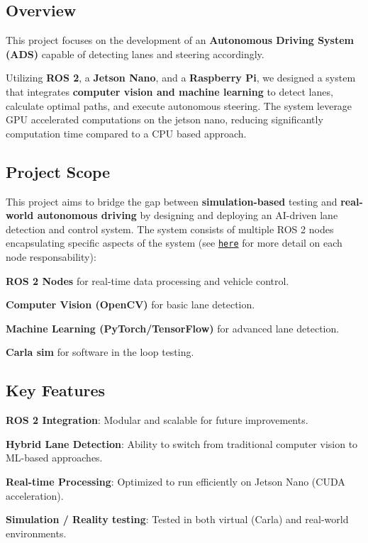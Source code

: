 \subsection*{Overview}

This project focuses on the development of an {\bfseries Autonomous Driving System (A\+DS)} capable of detecting lanes and steering accordingly.

Utilizing {\bfseries R\+OS 2}, a {\bfseries Jetson Nano}, and a {\bfseries Raspberry Pi}, we designed a system that integrates {\bfseries computer vision and machine learning} to detect lanes, calculate optimal paths, and execute autonomous steering. The system leverage G\+PU accelerated computations on the jetson nano, reducing significantly computation time compared to a C\+PU based approach.

\subsection*{Project Scope}

This project aims to bridge the gap between {\bfseries simulation-\/based} testing and {\bfseries real-\/world autonomous driving} by designing and deploying an A\+I-\/driven lane detection and control system. The system consists of multiple R\+OS 2 nodes encapsulating specific aspects of the system (see \href{https://github.com/Axel-ex/SEAME-ADS-Autonomous-lane-detection-24-25/tree/ml_vision/lane_keeping_ws}{\tt here} for more detail on each node responsability)\+:


\begin{DoxyItemize}
\item {\bfseries R\+OS 2 Nodes} for real-\/time data processing and vehicle control.
\item {\bfseries Computer Vision (Open\+CV)} for basic lane detection.
\item {\bfseries Machine Learning (Py\+Torch/\+Tensor\+Flow)} for advanced lane detection.
\item {\bfseries Carla sim} for software in the loop testing.
\end{DoxyItemize}

\subsection*{Key Features}


\begin{DoxyItemize}
\item {\bfseries R\+OS 2 Integration}\+: Modular and scalable for future improvements.
\item {\bfseries Hybrid Lane Detection}\+: Ability to switch from traditional computer vision to M\+L-\/based approaches.
\item {\bfseries Real-\/time Processing}\+: Optimized to run efficiently on Jetson Nano (C\+U\+DA acceleration).
\item {\bfseries Simulation / Reality testing}\+: Tested in both virtual (Carla) and real-\/world environments.
\end{DoxyItemize}

